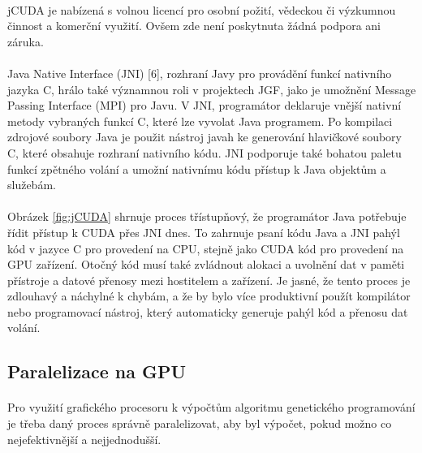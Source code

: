 \documentclass[bc,male,java,dept460]{diploma}		%
\begin{document}
\paragraph*{}
jCUDA je nabízená s volnou licencí pro osobní požití, vědeckou či výzkumnou činnost a komerční využití. Ovšem zde není poskytnuta žádná podpora ani záruka.

\paragraph*{}
Java Native Interface (JNI) [6], rozhraní Javy pro provádění funkcí nativního jazyka C, hrálo také významnou roli v projektech JGF, jako je umožnění Message Passing Interface (MPI) pro Javu. V JNI, programátor deklaruje vnější nativní metody vybraných funkcí C, které lze vyvolat Java programem. Po kompilaci zdrojové soubory Java je použit nástroj javah ke generování hlavičkové soubory C, které obsahuje rozhraní nativního kódu. JNI podporuje také bohatou paletu funkcí zpětného volání a umožní nativnímu kódu přístup k Java objektům a služebám.


\paragraph*{}
Obrázek \ref{fig:jCUDA} shrnuje proces třístupňový, že programátor Java potřebuje řídit přístup k CUDA přes JNI dnes. To zahrnuje psaní kódu Java a JNI pahýl kód v jazyce C pro provedení na CPU, stejně jako CUDA kód pro provedení na GPU zařízení. Otočný kód musí také zvládnout alokaci a uvolnění dat v paměti přístroje a datové přenosy mezi hostitelem a zařízení. Je jasné, že tento proces je zdlouhavý a náchylné k chybám, a že by bylo více produktivní použít kompilátor nebo programovací nástroj, který automaticky generuje pahýl kód a přenosu dat volání.

\subsection{Paralelizace na GPU}
\paragraph*{}
Pro využití grafického procesoru k výpočtům algoritmu genetického programování je třeba daný proces správně paralelizovat, aby byl výpočet, pokud možno co nejefektivnější a nejjednodušší.
\end{document}
